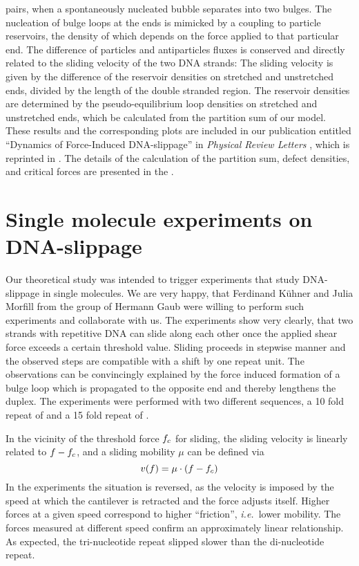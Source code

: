pairs, when a spontaneously nucleated bubble separates into two bulges. The nucleation of bulge loops at the
ends is mimicked by a coupling to particle reservoirs, the density of which depends on the 
force applied to that particular end. The difference of particles and antiparticles fluxes is conserved and 
directly related to the sliding velocity of the two DNA strands: The sliding velocity is given by 
the difference of the reservoir densities on stretched and unstretched ends, 
divided by the length of the double stranded region. 
The reservoir densities are determined by the pseudo-equilibrium loop densities 
on stretched and unstretched ends, which be calculated from the partition sum of our 
model. These results and the corresponding plots are included in our publication entitled 
``Dynamics of Force-Induced DNA-slippage'' in \emph{Physical Review Letters} \cite{Neher_PRL_04}, which is reprinted in . The details of the calculation of the partition sum, 
defect densities, and critical forces are presented in the .


\section{\label{sec:DNA_slippage_experiments}Single molecule experiments on DNA-slippage}
Our theoretical study was intended to trigger experiments that study DNA-slippage in single
molecules. We are very happy, that Ferdinand K\"uhner and Julia Morfill from the group of Hermann
Gaub were willing to perform such experiments and collaborate with us. 
The experiments show very clearly, that two strands with repetitive DNA can slide along each 
other once the applied shear force exceeds a certain threshold value. Sliding proceeds in  
stepwise manner and the observed steps are compatible with a shift by one repeat unit. 
The observations can be convincingly explained by the force induced formation of a bulge loop
which is propagated to the opposite end and thereby lengthens the duplex. 
The experiments were performed with two different sequences, a 10 fold repeat of 
 and a 15 fold repeat of  . 

In the vicinity of the threshold force ${f_c}$ for sliding, the sliding velocity is linearly related to $f-{f_c}$, 
and a sliding mobility $\mu$ can be defined via
\begin{equation}
\label{eq:sliding_mob}
v(f)=\mu \cdot(f-{f_c})
\end{equation}
In the experiments the situation is reversed, as the velocity is imposed by the speed at which the 
cantilever is retracted and the force adjusts itself. Higher forces at a given speed correspond to 
higher ``friction'', \emph{i.e.}~lower mobility. The forces measured at different speed confirm an 
approximately linear relationship. As expected, the tri-nucleotide repeat
slipped slower than the di-nucleotide repeat.

